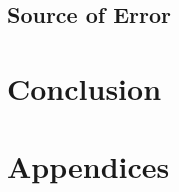 \documentclass[a4paper]{article}
\begin{document}
\subsection{Source of Error}

\section{Conclusion}

\section{Appendices}
\end{document}
